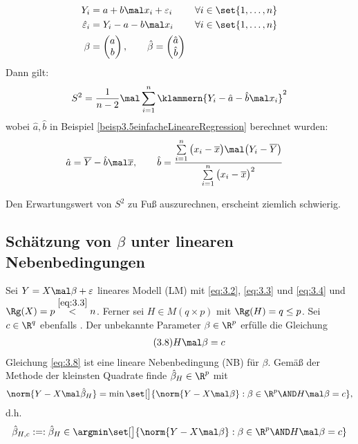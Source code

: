 \begin{beispiel}\label{beisp3.14einfacheLinareRegression}
	\begin{align*}
		Y_i&=a+b\mal x_i+\varepsilon_i &&\forall i\in\set{1,\ldots,n}\\
		\hat{\varepsilon}_i&=Y_i-a-b\mal x_i&&\forall i\in\set{1,\ldots,n}\\
		\beta&=\begin{pmatrix}
			a\\
			b
		\end{pmatrix},\qquad \hat{\beta}=\begin{pmatrix}
			\hat{a}\\
			\hat{b}
		\end{pmatrix}
	\end{align*}
	Dann gilt:
	\begin{align*}
		S^2=\frac{1}{n-2}\mal\sum\limits_{i=1}^n\klammern{Y_i-\hat{a}-\hat{b}\mal x_i}^2
	\end{align*}
	wobei $\hat{a},\hat{b}$ in Beispiel \ref{beisp3.5einfacheLineareRegression} berechnet wurden:
	\begin{align*}
		\hat{a}&=\overline{Y}-\hat{b}\mal\overline{x},\qquad
		\hat{b}=\frac{\sum\limits_{i=1}^n\big(x_i-\overline{x}\big)\mal\big(Y_i-\overline{Y}\big)}{\sum\limits_{i=1}^n\big(x_i-\overline{x}\big)^2}
	\end{align*}
	
	\begin{bemerkung}
		Den Erwartungswert von $S^2$ zu Fuß auszurechnen, erscheint ziemlich schwierig.
	\end{bemerkung}
\end{beispiel}

\subsection{Schätzung von \texorpdfstring{$\beta$}{Beta} unter linearen Nebenbedingungen} %

Sei $Y=X\mal\beta+\varepsilon$ lineares Modell (LM) mit \eqref{eq:3.2}, \eqref{eq:3.3} und \eqref{eq:3.4} und $\Rg(X)=p\overset{\eqref{eq:3.3}}{<}n$.
Ferner sei $H\in M(q\times p)$  mit $\Rg(H)=q\leq p$.
Sei $c\in\R^q$ ebenfalls .
Der unbekannte Parameter $\beta\in\R^p$ erfülle die Gleichung
\begin{align}\label{eq:3.8}\tag{3.8}
	H\mal\beta=c
\end{align}
Gleichung \eqref{eq:3.8} ist eine lineare Nebenbedingung (NB) für $\beta$.
Gemäß der Methode der kleinsten Quadrate finde $\hat{\beta}_H\in\R^p$ mit
\begin{align*}
	\norm{Y-X\mal\hat{\beta}_H}=\min\set[\big]{\norm{Y-X\mal\beta}:\beta\in\R^p\AND   H\mal\beta=c},
\end{align*}
d.h. 
\begin{align*}
	\hat{\beta}_{H,c}:=:\hat{\beta}_H\in\argmin\set[\big]{\norm{Y-X\mal\beta}:\beta\in\R^p\AND H\mal\beta=c}
\end{align*}

